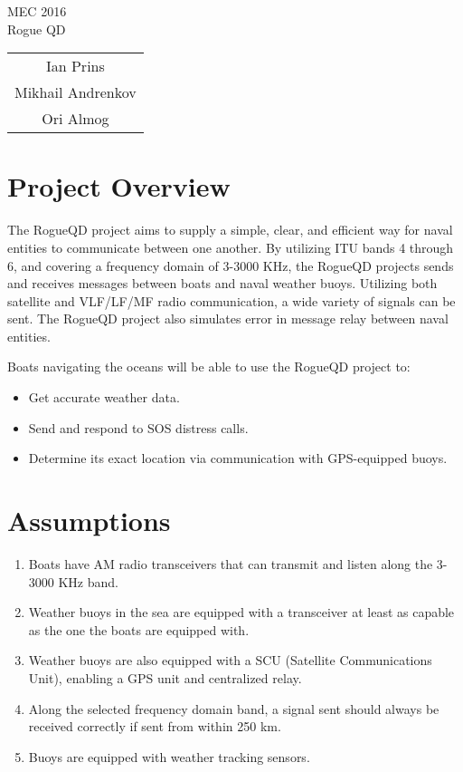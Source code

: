 \documentclass{article}
\begin{document}
\centering
\huge MEC 2016\\
\normalsize Rogue QD\\

\bigskip
\bigskip

\begin{tabular}{c}
	Ian Prins\\
	Mikhail Andrenkov\\
	Ori Almog\\
\end{tabular}

\newpage
\flushleft

\section{Project Overview} %

	The RogueQD project aims to supply a simple, clear, and efficient way for naval entities to communicate between one another. By utilizing ITU bands 4 through 6, and covering a frequency domain of 3-3000 KHz, the RogueQD projects sends and receives messages between boats and naval weather buoys. Utilizing both satellite and VLF/LF/MF radio communication, a wide variety of signals can be sent. The RogueQD project also simulates error in message relay between naval entities.

	\bigskip

	Boats navigating the oceans will be able to use the RogueQD project to:

	\begin{itemize}
		\item Get accurate weather data.
		\item Send and respond to SOS distress calls.
		\item Determine its exact location via communication with GPS-equipped buoys. 
	\end{itemize}


\section{Assumptions} %

	\begin{enumerate}
		\item Boats have AM radio transceivers that can transmit and listen along the 3-3000 KHz band.
		\item Weather buoys in the sea are equipped with a transceiver at least as capable as the one the boats are equipped with.
		\item Weather buoys are also equipped with a SCU (Satellite Communications Unit), enabling a GPS unit and centralized relay.
		\item Along the selected frequency domain band, a signal sent should always be received correctly if sent from within 250 km.
		\item Buoys are equipped with weather tracking sensors.
	\end{enumerate}
\end{document}
